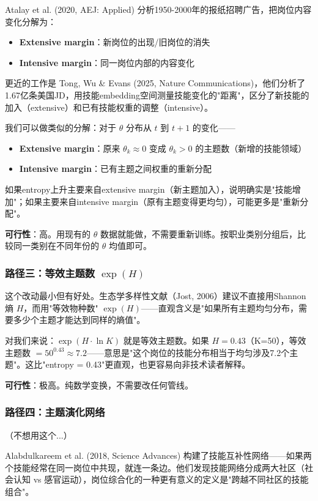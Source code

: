 \documentclass[12pt,a4paper]{ctexart}
\begin{document}
Atalay et al. (2020, AEJ: Applied) 分析1950-2000年的报纸招聘广告，把岗位内容变化分解为：
\begin{itemize}
\item \textbf{Extensive margin}：新岗位的出现/旧岗位的消失
\item \textbf{Intensive margin}：同一岗位内部的内容变化
\end{itemize}

更近的工作是 Tong, Wu \& Evans (2025, Nature Communications)，他们分析了1.67亿条美国JD，用技能embedding空间测量技能变化的"距离"，区分了新技能的加入（extensive）和已有技能权重的调整（intensive）。

我们可以做类似的分解：对于 $\theta$ 分布从 $t$ 到 $t+1$ 的变化——
\begin{itemize}
\item \textbf{Extensive margin}：原来 $\theta_k \approx 0$ 变成 $\theta_k > 0$ 的主题数（新增的技能领域）
\item \textbf{Intensive margin}：已有主题之间权重的重新分配
\end{itemize}

如果entropy上升主要来自extensive margin（新主题加入），说明确实是"技能增加"；如果主要来自intensive margin（原有主题变得更均匀），可能更多是"重新分配"。

\textbf{可行性}：高。用现有的 $\theta$ 数据就能做，不需要重新训练。按职业类别分组后，比较同一类别在不同年份的 $\theta$ 均值即可。

\subsubsection{路径三：等效主题数 $\exp(H)$}

这个改动最小但有好处。生态学多样性文献（Jost, 2006）建议不直接用Shannon熵 $H$，而用"等效物种数" $\exp(H)$——直观含义是"如果所有主题均匀分布，需要多少个主题才能达到同样的熵值"。

对我们来说：$\exp(H \cdot \ln K)$ 就是等效主题数。如果 $H = 0.43$（K=50），等效主题数 $= 50^{0.43} \approx 7.2$——意思是"这个岗位的技能分布相当于均匀涉及7.2个主题"。这比"entropy = 0.43"更直观，也更容易向非技术读者解释。

\textbf{可行性}：极高。纯数学变换，不需要改任何管线。

\subsubsection{路径四：主题演化网络}
（不想用这个...）

Alabdulkareem et al. (2018, Science Advances) 构建了技能互补性网络——如果两个技能经常在同一岗位中共现，就连一条边。他们发现技能网络分成两大社区（社会认知 vs 感官运动），岗位综合化的一种更有意义的定义是"跨越不同社区的技能组合"。
\end{document}
